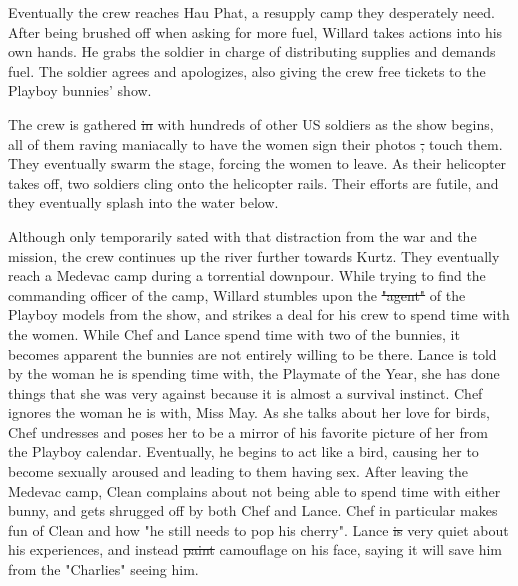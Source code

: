 \documentclass[a4paper,man,natbib]{apa6}
\providecommand{\DIFadd}[1]{{\protect\color{blue}\uwave{#1}}} %
\providecommand{\DIFdel}[1]{{\protect\color{red}\sout{#1}}}                      %
\providecommand{\DIFaddbegin}{} %
\providecommand{\DIFaddend}{} %
\providecommand{\DIFdelbegin}{} %
\providecommand{\DIFdelend}{} %
\begin{document}
Eventually the crew reaches Hau Phat, a resupply camp they desperately need. After being brushed off when asking for more fuel, Willard takes actions into his own hands. He grabs the soldier in charge of distributing supplies and demands fuel. The soldier agrees and apologizes, also giving the crew free tickets to the Playboy bunnies' show.

The crew is gathered \DIFdelbegin \DIFdel{in }\DIFdelend with hundreds of other US soldiers as the show begins, all of them raving maniacally to have the women sign their photos \DIFdelbegin \DIFdel{, }\DIFdelend \DIFaddbegin \DIFadd{and }\DIFaddend touch them. They eventually swarm the stage, forcing the women to leave. As their helicopter takes off, two soldiers cling onto the helicopter rails. Their efforts are futile, and they eventually splash into the water below.

Although only temporarily sated with that distraction from the war and the mission, the crew continues up the river further towards Kurtz. They eventually reach a Medevac camp during a torrential downpour. While trying to find the commanding officer of the camp, Willard stumbles upon the \DIFdelbegin \DIFdel{"agent" }\DIFdelend \DIFaddbegin \DIFadd{pimp }\DIFaddend of the Playboy models from the show, and strikes a deal for his crew to spend time with the women. While Chef and Lance spend time with two of the bunnies, it becomes apparent the bunnies are not entirely willing to be there. Lance is told by the woman he is spending time with, the Playmate of the Year, she has done things that she was very against because it is almost a survival instinct. Chef ignores the woman he is with, Miss May. As she talks about her love for birds, Chef undresses and poses her to be a mirror of his favorite picture of her from the Playboy calendar. Eventually, he begins to act like a bird, causing her to become sexually aroused and leading to them having sex. After leaving the Medevac camp, Clean complains about not being able to spend time with either bunny, and gets shrugged off by both Chef and Lance. Chef in particular makes fun of Clean and how "he still needs to pop his cherry". Lance \DIFdelbegin \DIFdel{is }\DIFdelend \DIFaddbegin \DIFadd{was }\DIFaddend very quiet about his experiences, and instead \DIFdelbegin \DIFdel{paint }\DIFdelend \DIFaddbegin \DIFadd{painted }\DIFaddend camouflage on his face, saying it will save him from the "Charlies" seeing him.
\end{document}
